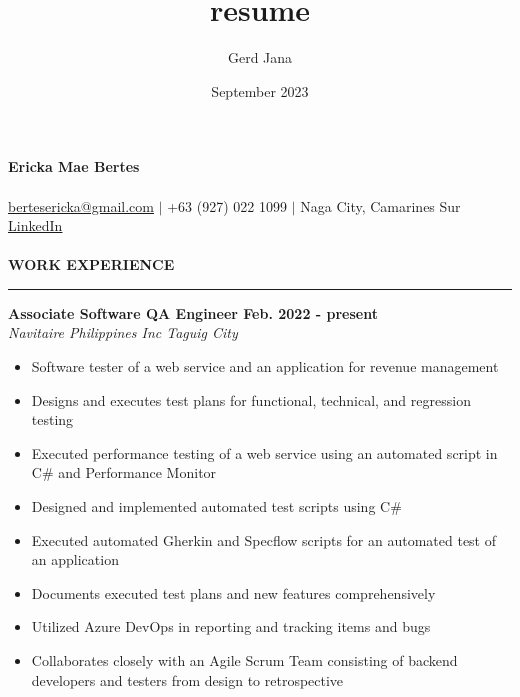 \documentclass{amsbook}
\title{resume}
\author{Gerd Jana}
\date{September 2023}
\begin{document}
\hspace{-1cm}\textbf{{\larger[8] Ericka Mae Bertes}}
\\\\
{\larger[2]\href{mailto:bertesericka@gmail.com}{bertesericka@gmail.com} } $|$ +63 (927) 022 1099 $|$ Naga City, Camarines Sur\\
\underline{\href{https://www.linkedin.com/in/ericka-mae-bertes-3590a2168/}{LinkedIn}} 
\\
\\
\textbf{WORK EXPERIENCE}
\\
\rule{\textwidth}{1pt} 
\textbf{Associate Software QA Engineer \hfill Feb. 2022 \@- present}
\\
\textit{Navitaire Philippines Inc \hfill Taguig City}
\begin{itemize}
    \item Software tester of a web service and an application for revenue management
    \item Designs and executes test plans for functional, technical, and regression testing
    \item Executed performance testing of a web service using an automated script in C\# and Performance Monitor
    \item Designed and implemented automated test scripts using C\#
    \item Executed automated Gherkin and Specflow scripts for an automated test of an application
    \item Documents executed test plans and new features comprehensively
    \item Utilized Azure DevOps in reporting and tracking items and bugs
    \item Collaborates closely with an Agile Scrum Team consisting of backend developers and testers from design to retrospective
    
\end{itemize}
\end{document}
